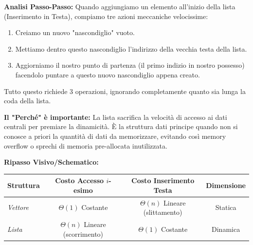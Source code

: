 \documentclass[a4paper, 11pt]{report}
\begin{document}
\textbf{Analisi Passo-Passo:}
Quando aggiungiamo un elemento all'inizio della lista (Inserimento in Testa), compiamo tre azioni meccaniche velocissime:
\begin{enumerate}
\item Creiamo un nuovo "nascondiglio" vuoto.
\item Mettiamo dentro questo nascondiglio l'indirizzo della vecchia testa della lista.
\item Aggiorniamo il nostro punto di partenza (il primo indizio in nostro possesso) facendolo puntare a questo nuovo nascondiglio appena creato.
\end{enumerate}
Tutto questo richiede 3 operazioni, ignorando completamente quanto sia lunga la coda della lista.

\textbf{Il "Perché" è importante:}
La lista sacrifica la velocità di accesso ai dati centrali per premiare la dinamicità. È la struttura dati principe quando non si conosce a priori la quantità di dati da memorizzare, evitando così memory overflow o sprechi di memoria pre-allocata inutilizzata.

\textbf{Ripasso Visivo/Schematico:}
\begin{center}
\begin{tabular}{|l|c|c|c|}
\hline
\textbf{Struttura} & \textbf{Costo Accesso $i$-esimo} & \textbf{Costo Inserimento Testa} & \textbf{Dimensione} \\
\hline
\textit{Vettore} & $\Theta(1)$ Costante & $\Theta(n)$ Lineare (slittamento) & Statica \\
\hline
\textit{Lista} & $\Theta(n)$ Lineare (scorrimento) & $\Theta(1)$ Costante & Dinamica \\
\hline
\end{tabular}
\end{center}
\end{document}
